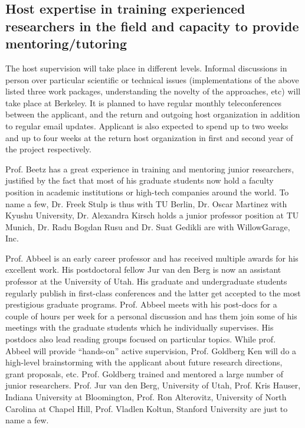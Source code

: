 \subsection{Host expertise in training  experienced researchers in the field and capacity to provide 
mentoring/tutoring} 
The host supervision will take place in different levels. Informal discussions in person over
particular scientific or technical issues (implementations of the above listed three 
work packages, understanding the novelty of the approaches, etc) will take place
at Berkeley. It is planned to have regular monthly teleconferences between the applicant, 
and the return and outgoing host organization in addition to regular email
updates. Applicant is also expected to spend up to two weeks and up to four weeks
at the return host organization in first and second year of the project respectively.

Prof. Beetz has a great experience in training and mentoring junior researchers, justified 
by the fact that most of his graduate students now hold a faculty position in academic 
institutions or high-tech companies around the world. To name a few, Dr. Freek Stulp is thus with TU Berlin, 
Dr. Oscar Martinez with Kyushu University, Dr. Alexandra Kirsch holds a junior professor position at 
TU Munich, Dr. Radu Bogdan Rusu and Dr. Suat Gedikli are with WillowGarage, Inc.

Prof. Abbeel is an early career professor and has received multiple awards for his excellent work.
His postdoctoral fellow Jur van den Berg is now an assistant professor at the University of Utah.
His graduate and undergraduate students regularly publish in first-class conferences and the latter
get accepted to the most prestigious graduate programs. Prof. Abbeel meets with his post-docs for 
a couple of hours per week for a personal discussion and has them join some of his meetings with 
the graduate students which he individually supervises. His postdocs also lead reading groups
focused on particular topics. While prof. Abbeel will provide ``hands-on''
active supervision, Prof. Goldberg Ken will do a high-level brainstorming with the applicant about 
future research directions, grant proposals, etc. Prof. Goldberg trained and mentored a large number
of junior researchers. Prof. Jur van den Berg, University of Utah, Prof. Kris Hauser, Indiana University at Bloomington, 
Prof. Ron Alterovitz, University of North Carolina at Chapel Hill, Prof.  Vladlen Koltun, Stanford University
are just to name a few.

